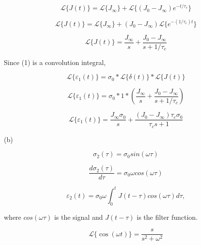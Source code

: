\documentclass{article}
\begin{document}
\begin{equation*}
     \mathcal{L}\{J(t)\} = \mathcal{L}\{J_\infty\} + \mathcal{L}\{(J_0-J_\infty)e^{-t/\tau_c}\}
\end{equation*}

\begin{equation*}
    \mathcal{L}\{J(t)\} = \mathcal{L}\{J_\infty\} + (J_0-J_\infty)\mathcal{L}\{e^{-(1/\tau_c)t}\}
\end{equation*}

\begin{equation*}
    \mathcal{L}\{J(t)\} = \frac{J_\infty}{s} + \frac{J_0-J_\infty}{s+1/\tau_c}
\end{equation*}

\bigskip

Since (1) is a convolution integral,

\begin{equation*}
    \mathcal{L}\{\varepsilon_1(t)\} = \sigma_0*\mathcal{L}\{\delta(t)\}*\mathcal{L}\{J(t)\}
\end{equation*}

\begin{equation*}
    \mathcal{L}\{\varepsilon_1(t)\} = \sigma_0*1*(\frac{J_\infty}{s} + \frac{J_0-J_\infty}{s+1/\tau_c})
\end{equation*}

\begin{equation*}
    \mathcal{L}\{\varepsilon_1(t)\} = \frac{J_\infty\sigma_0}{s} + \frac{(J_0-J_\infty)\tau_c\sigma_0}{\tau_cs+1}
\end{equation*}

\newpage


(b)

\begin{equation*}
    \sigma_2(\tau) = \sigma_0 sin(\omega \tau)
\end{equation*}

\begin{equation*}
    \frac{d\sigma_2(\tau)}{d\tau} = \sigma_0 \omega cos(\omega \tau)
\end{equation*}

\begin{equation}
    \varepsilon_2(t) = \sigma_0 \omega \int_0^t J(t-\tau) cos(\omega \tau) d\tau,
\end{equation}

where $cos(\omega \tau)$ is the signal and $J(t-\tau)$ is the filter function.

\bigskip

\begin{equation*}
    \mathcal{L}\{\cos(\omega t)\} = \frac{s}{s^2+\omega^2}
\end{equation*}
\end{document}
